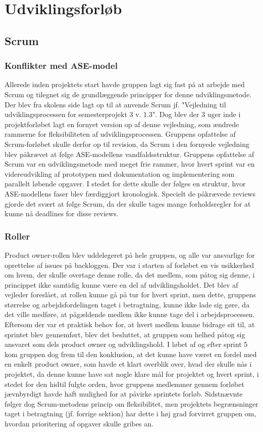 \section{Udviklingsforløb} 

\subsection{Scrum}
\subsubsection{Konflikter med ASE-model}
Allerede inden projektets start havde gruppen lagt sig fast på at arbejde med Scrum og tilegnet sig de grundlæggende principper for denne udviklingsmetode. 
Der blev fra skolens side lagt op til at anvende Scrum jf. "Vejledning til udviklingsprocessen for semesterprojekt 3 v. 1.3". Dog blev der 3 uger inde i 
projektforløbet lagt en fornyet version op af denne vejledning, som ændrede rammerne for fleksibiliteten af udviklingsprocessen. Gruppens opfattelse af 
Scrum-forløbet skulle derfor op til revision, da Scrum i den fornyede vejledning blev påkrævet at følge ASE-modellens vandfaldsstruktur. Gruppens opfattelse 
af Scrum var en udviklingsmetode med meget frie rammer, hvor hvert sprint var en videreudvikling af prototypen med dokumentation og implementering som 
parallelt løbende opgaver. I stedet for dette skulle der følges en struktur, hvor ASE-modellens faser blev færdiggjort kronologisk. Specielt de påkrævede 
reviews gjorde det svært at følge Scrum, da der skulle tages mange forholdsregler for at kunne nå deadlines for disse reviews.
 
\subsubsection{Roller}
Product owner-rollen blev uddelegeret på hele gruppen, og alle var ansvarlige for oprettelse af issues på backloggen. Der var i starten af forløbet en vis 
usikkerhed om hvem, der skulle overtage denne rolle, da det medlem, som påtog sig denne, i princippet ikke samtidig kunne være en del af udviklingsholdet. 
Det blev af vejleder foreslået, at rollen kunne gå på tur for hvert sprint, men dette, gruppens størrelse og arbejdsfordelingen taget i betragtning, kunne 
ikke lade sig gøre, da det ville medføre, at pågældende medlem ikke kunne tage del i arbejdsprocessen. Eftersom der var et praktisk behov for, at hvert medlem
kunne bidrage sit til, at sprintet blev gennemført, blev det besluttet, at gruppen som helhed påtog sig ansvaret som dels product owner og udviklingshold. I 
løbet af og efter sprint 5 kom gruppen dog frem til den konklusion, at det kunne have været en fordel med en enkelt product owner, som havde et klart overblik 
over, hvad der skulle nås i projektet, da denne kunne have sat nogle klare mål for projektet og hvert sprint, i stedet for den hidtil fulgte orden, hvor 
gruppens medlemmer gennem forløbet jævnbyrdigt havde haft mulighed for at påvirke sprintets forløb. Sidstnævnte følger dog Scrum-metodens princip om 
fleksibilitet, men
projektets begrænsninger taget i betragtning (jf. forrige sektion) har dette i høj grad forvirret gruppen om, hvordan prioritering af opgaver skulle gribes an.

